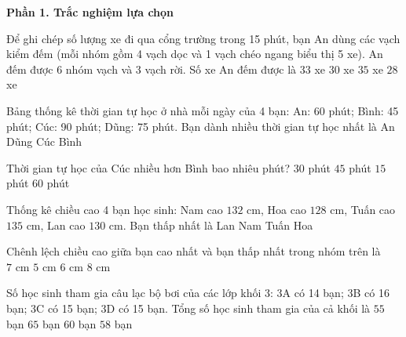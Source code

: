 \textbf{Phần 1. Trắc nghiệm lựa chọn}

\begin{ex} %
Để ghi chép số lượng xe đi qua cổng trường trong 15 phút, bạn An dùng các vạch kiểm đếm (mỗi nhóm gồm 4 vạch dọc và 1 vạch chéo ngang biểu thị 5 xe). An đếm được 6 nhóm vạch và 3 vạch rời. Số xe An đếm được là
\choice
{\True $33$ xe}
{$30$ xe}
{$35$ xe}
{$28$ xe}
\end{ex}

\begin{ex} %
Bảng thống kê thời gian tự học ở nhà mỗi ngày của 4 bạn: An: 60 phút; Bình: 45 phút; Cúc: 90 phút; Dũng: 75 phút. Bạn dành nhiều thời gian tự học nhất là
\choice
{An}
{Dũng}
{\True Cúc}
{Bình}
\end{ex}

\begin{ex} %
Thời gian tự học của Cúc nhiều hơn Bình bao nhiêu phút?
\choice
{$30$ phút}
{\True $45$ phút}
{$15$ phút}
{$60$ phút}
\end{ex}

\begin{ex} %
Thống kê chiều cao 4 bạn học sinh: Nam cao $132\text{ cm}$, Hoa cao $128\text{ cm}$, Tuấn cao $135\text{ cm}$, Lan cao $130\text{ cm}$. Bạn thấp nhất là
\choice
{Lan}
{Nam}
{Tuấn}
{\True Hoa}
\end{ex}

\begin{ex} %
Chênh lệch chiều cao giữa bạn cao nhất và bạn thấp nhất trong nhóm trên là
\choice
{\True $7\text{ cm}$}
{$5\text{ cm}$}
{$6\text{ cm}$}
{$8\text{ cm}$}
\end{ex}

\begin{ex} %
Số học sinh tham gia câu lạc bộ bơi của các lớp khối 3: 3A có 14 bạn; 3B có 16 bạn; 3C có 15 bạn; 3D có 15 bạn. Tổng số học sinh tham gia của cả khối là
\choice
{$55$ bạn}
{$65$ bạn}
{\True $60$ bạn}
{$58$ bạn}
\end{ex}

